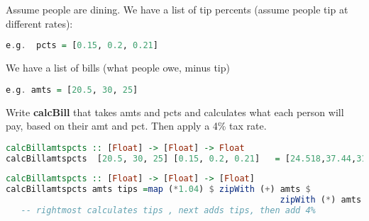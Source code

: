 \documentclass{article}
\begin{document}
\begin{Exercise}[title={Using \$}]
Assume people are dining. We have a list of tip percents (assume people tip at different rates):\\
\begin{lstlisting}[language=Haskell]
e.g.  pcts = [0.15, 0.2, 0.21]  
\end{lstlisting} 
We have a list of bills (what people owe, minus tip)  \\
\begin{lstlisting}[language=Haskell]
e.g. amts = [20.5, 30, 25] 
\end{lstlisting} 
Write \textbf{calcBill }that takes amts and pcts and calculates what each person will pay, based on their amt and pct. 
Then apply a 4\% tax rate.

\begin{lstlisting}[language=Haskell]
calcBillamtspcts :: [Float] -> [Float] -> Float
calcBillamtspcts  [20.5, 30, 25] [0.15, 0.2, 0.21]   = [24.518,37.44,31.46]
\end{lstlisting} 
\end{Exercise} 
\begin{Answer}
\begin{lstlisting}[language=Haskell]
calcBillamtspcts :: [Float] -> [Float] -> [Float]
calcBillamtspcts amts tips =map (*1.04) $ zipWith (+) amts $ 
                                                      zipWith (*) amts  tips
   -- rightmost calculates tips , next adds tips, then add 4%
\end{lstlisting} 
\end{Answer}




\end{document}
